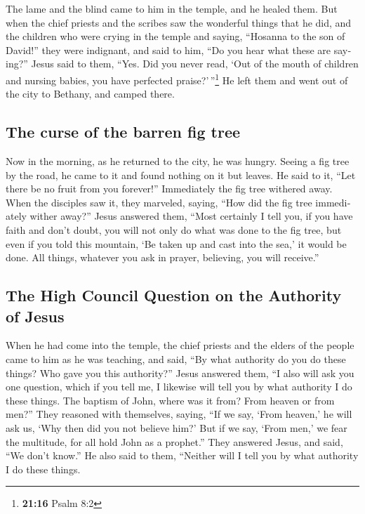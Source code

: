 \begin{paracol}{2}
\begin{otherlanguage}{english}
 The lame and the blind came to him in the temple, and he
healed them.  But when the chief priests and the scribes
saw the wonderful things that he did, and the children who were crying
in the temple and saying, ``Hosanna to the son of David!'' they were
indignant,  and said to him, ``Do you hear what these are
saying?'' Jesus said to them, ``Yes. Did you never read, `Out of the
mouth of children and nursing babies, you have perfected
praise?'\,''\footnote{\textbf{21:16} Psalm 8:2}  He left
them and went out of the city to Bethany, and camped there.

\hypertarget{the-curse-of-the-barren-fig-tree}{%
\subsection{The curse of the barren fig
tree}\label{the-curse-of-the-barren-fig-tree}}

 Now in the morning, as he returned to the city, he was
hungry.  Seeing a fig tree by the road, he came to it and
found nothing on it but leaves. He said to it, ``Let there be no fruit
from you forever!'' Immediately the fig tree withered away.
 When the disciples saw it, they marveled, saying, ``How
did the fig tree immediately wither away?''  Jesus
answered them, ``Most certainly I tell you, if you have faith and don't
doubt, you will not only do what was done to the fig tree, but even if
you told this mountain, `Be taken up and cast into the sea,' it would be
done.  All things, whatever you ask in prayer, believing,
you will receive.''

\hypertarget{the-high-council-question-on-the-authority-of-jesus}{%
\subsection{The High Council Question on the Authority of
Jesus}\label{the-high-council-question-on-the-authority-of-jesus}}

 When he had come into the temple, the chief priests and
the elders of the people came to him as he was teaching, and said, ``By
what authority do you do these things? Who gave you this authority?''
 Jesus answered them, ``I also will ask you one question,
which if you tell me, I likewise will tell you by what authority I do
these things.  The baptism of John, where was it from?
From heaven or from men?'' They reasoned with themselves, saying, ``If
we say, `From heaven,' he will ask us, `Why then did you not believe
him?'  But if we say, `From men,' we fear the multitude,
for all hold John as a prophet.''  They answered Jesus,
and said, ``We don't know.'' He also said to them, ``Neither will I tell
you by what authority I do these things.


\end{otherlanguage}
\end{paracol}

